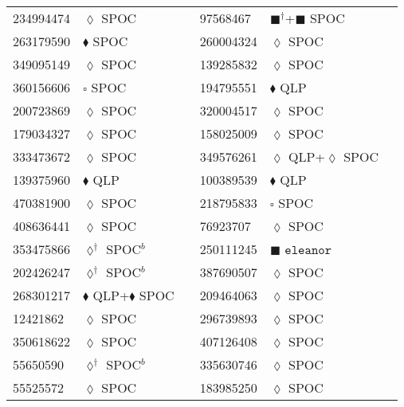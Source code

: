 \begin{longtable}{llrllr}
234994474 & $\lozenge$ SPOC & \cite{TIC_234994474} & 97568467 & $\blacksquare^\dagger$+$\blacksquare$ SPOC & \cite{TIC_428787891} \\
263179590 & $\blacklozenge$ SPOC & \cite{TIC_263179590} & 260004324 & $\lozenge$ SPOC & \cite{TIC_103633434} \\
349095149 & $\lozenge$ SPOC & \cite{TIC_349095149} & 139285832 & $\lozenge$ SPOC & \cite{TIC_139285832} \\
360156606 & $\square$ SPOC & \cite{TIC_360156606} & 194795551 & $\blacklozenge$ QLP & \cite{TIC_70524163} \\
200723869 & $\lozenge$ SPOC & \cite{TIC_200723869} & 320004517 & $\lozenge$ SPOC & \cite{TIC_320004517} \\
179034327 & $\lozenge$ SPOC & \cite{TIC_70513361} & 158025009 & $\lozenge$ SPOC & \cite{TIC_158025009} \\
333473672 & $\lozenge$ SPOC & \cite{TIC_333473672} & 349576261 & $\lozenge$ QLP+$\lozenge$ SPOC & \cite{TIC_349576261} \\
139375960 & $\blacklozenge$ QLP & \cite{TIC_409794137} &  100389539 & $\blacklozenge$ QLP & \cite{TIC_156648452} \\
470381900 & $\lozenge$ SPOC & \cite{TIC_470381900} & 218795833 & $\square$ SPOC & \cite{TIC_218795833} \\
408636441 & $\lozenge$ SPOC & \cite{TIC_408636441} & 76923707 & $\lozenge$ SPOC & \cite{TIC_76923707} \\
353475866 & $\lozenge^\dagger$ SPOC$^b$ & \cite{TIC_10837041} &  250111245 & $\blacksquare$ $\texttt{eleanor}$ & \cite{TIC_20182780} \\
202426247 & $\lozenge^\dagger$ SPOC$^b$ & \cite{TIC_10837041} & 387690507 & $\lozenge$ SPOC & \cite{TIC_387690507} \\
268301217 & $\blacklozenge$ QLP+$\blacklozenge$ SPOC & \cite{TIC_156648452} & 209464063 & $\lozenge$ SPOC & \cite{TIC_209464063} \\
12421862 & $\lozenge$ SPOC & \cite{TIC_70513361} & 296739893 & $\lozenge$ SPOC & \cite{TIC_296739893} \\
350618622 & $\lozenge$ SPOC & \cite{TIC_350618622} & 407126408 & $\lozenge$ SPOC & \cite{TIC_428699140} \\
55650590 & $\lozenge^\dagger$ SPOC$^b$ & \cite{TIC_10837041} & 335630746 & $\lozenge$ SPOC & \cite{TIC_335630746} \\
55525572 & $\lozenge$ SPOC & \cite{TIC_55525572} & 183985250 & $\lozenge$ SPOC & \cite{TIC_183985250} \\

\end{longtable}
